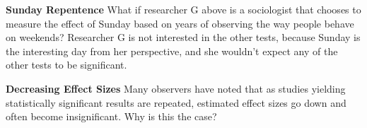 \documentclass[
  letterpaper,
  DIV=11,
  numbers=noendperiod]{scrreprt}
\begin{document}
\textbf{Sunday Repentence} What if researcher G above is a sociologist
that chooses to measure the effect of Sunday based on years of observing
the way people behave on weekends? Researcher G is not interested in the
other tests, because Sunday is the interesting day from her perspective,
and she wouldn't expect any of the other tests to be significant.

\textbf{Decreasing Effect Sizes} Many observers have noted that as
studies yielding statistically significant results are repeated,
estimated effect sizes go down and often become insignificant. Why is
this the case?
\end{document}
